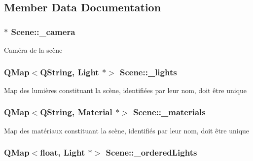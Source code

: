 \subsection{Member Data Documentation}
\hypertarget{class_scene_a8cce9e0f96edc8655a9b9a885e2c26bf}{
\subsubsection[{\+\_\+camera}]{$\ast$ Scene\+::\+\_\+camera}}\label{class_scene_a8cce9e0f96edc8655a9b9a885e2c26bf}
Caméra de la scène \hypertarget{class_scene_a0ef33120973d6afc1754d2154d7c338a}{
\subsubsection[{\+\_\+lights}]{\setlength{\rightskip}{0pt plus 5cm}Q\+Map$<$Q\+String, {\bf Light} $\ast$$>$ Scene\+::\+\_\+lights\hspace{0.3cm}{\ttfamily [private]}}}\label{class_scene_a0ef33120973d6afc1754d2154d7c338a}
Map des lumières constituant la scène, identifiées par leur nom, doit être unique \hypertarget{class_scene_a5b96810fdeb47632d5ce6c2c47f41691}{
\subsubsection[{\+\_\+materials}]{\setlength{\rightskip}{0pt plus 5cm}Q\+Map$<$Q\+String, {\bf Material} $\ast$$>$ Scene\+::\+\_\+materials\hspace{0.3cm}{\ttfamily [private]}}}\label{class_scene_a5b96810fdeb47632d5ce6c2c47f41691}
Map des matériaux constituant la scène, identifiés par leur nom, doit être unique \hypertarget{class_scene_a5fae715ba6bdde7c382f9d779095a718}{
\subsubsection[{\+\_\+ordered\+Lights}]{\setlength{\rightskip}{0pt plus 5cm}Q\+Map$<$float, {\bf Light} $\ast$$>$ Scene\+::\+\_\+ordered\+Lights\hspace{0.3cm}{\ttfamily [private]}}}\label{class_scene_a5fae715ba6bdde7c382f9d779095a718}
